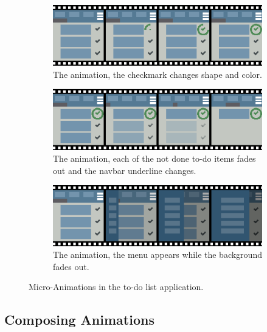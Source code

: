 \begin{figure}[!htbp]
\centering

\begin{subfigure}[h]{\textwidth}
\centering
\includegraphics[width=\figscale\textwidth]{pictures/completeIconCheckFig}
\caption{The  animation, the checkmark changes shape and color.}
\label{fig:completeIconCheck}
\end{subfigure}

\begin{subfigure}[h]{\textwidth}
\centering
\includegraphics[width=\figscale\textwidth]{pictures/onlyDoneFig}
\caption{The  animation, each of the not done to-do items fades out and the navbar underline changes.}
\label{fig:onlyDoneFig}
\end{subfigure}

\begin{subfigure}[h]{\textwidth}
\centering
\includegraphics[width=\figscale\textwidth]{pictures/menuIntroFig}
\caption{The  animation, the menu appears while the background fades out.}
\label{fig:menuIntroFig}
\end{subfigure}

\caption{Micro-Animations in the to-do list application.}
\label{fig:animExamples}
\end{figure}

\subsection{Composing Animations}

